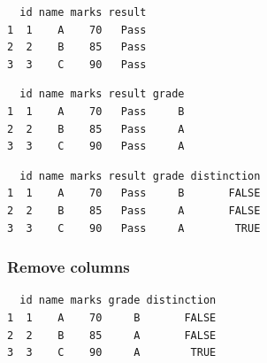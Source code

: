 \documentclass[
  letterpaper,
  DIV=11,
  numbers=noendperiod]{scrartcl}
\newenvironment{Shaded}{\begin{snugshade}}{\end{snugshade}}
\newcommand{\ConstantTok}[1]{\textcolor[rgb]{0.56,0.35,0.01}{#1}}
\newcommand{\DecValTok}[1]{\textcolor[rgb]{0.68,0.00,0.00}{#1}}
\newcommand{\FunctionTok}[1]{\textcolor[rgb]{0.28,0.35,0.67}{#1}}
\newcommand{\NormalTok}[1]{\textcolor[rgb]{0.00,0.23,0.31}{#1}}
\newcommand{\OtherTok}[1]{\textcolor[rgb]{0.00,0.23,0.31}{#1}}
\newcommand{\SpecialCharTok}[1]{\textcolor[rgb]{0.37,0.37,0.37}{#1}}
\newcommand{\StringTok}[1]{\textcolor[rgb]{0.13,0.47,0.30}{#1}}
\begin{document}
\begin{verbatim}
  id name marks result
1  1    A    70   Pass
2  2    B    85   Pass
3  3    C    90   Pass
\end{verbatim}

\begin{Shaded}
\end{Shaded}

\begin{verbatim}
  id name marks result grade
1  1    A    70   Pass     B
2  2    B    85   Pass     A
3  3    C    90   Pass     A
\end{verbatim}

\begin{Shaded}
\end{Shaded}

\begin{verbatim}
  id name marks result grade distinction
1  1    A    70   Pass     B       FALSE
2  2    B    85   Pass     A       FALSE
3  3    C    90   Pass     A        TRUE
\end{verbatim}

\subsubsection{Remove columns}\label{remove-columns}

\begin{Shaded}
\end{Shaded}

\begin{verbatim}
  id name marks grade distinction
1  1    A    70     B       FALSE
2  2    B    85     A       FALSE
3  3    C    90     A        TRUE
\end{verbatim}
\end{document}

